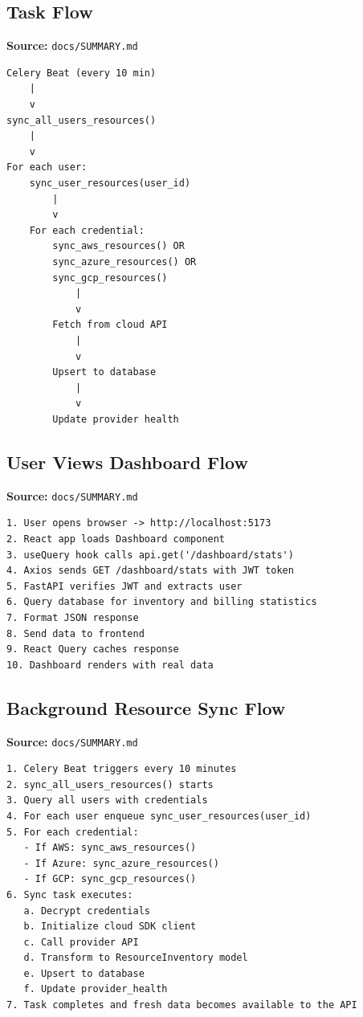 \subsection{Task Flow}
\textbf{Source:} \texttt{docs/SUMMARY.md}
\begin{lstlisting}[numbers=none,basicstyle=\ttfamily\tiny,caption={Task Flow Adapted from docs/SUMMARY.md}]
Celery Beat (every 10 min)
    |
    v
sync_all_users_resources()
    |
    v
For each user:
    sync_user_resources(user_id)
        |
        v
    For each credential:
        sync_aws_resources() OR
        sync_azure_resources() OR
        sync_gcp_resources()
            |
            v
        Fetch from cloud API
            |
            v
        Upsert to database
            |
            v
        Update provider health
\end{lstlisting}

\subsection{User Views Dashboard Flow}
\textbf{Source:} \texttt{docs/SUMMARY.md}
\begin{lstlisting}[numbers=none,basicstyle=\ttfamily\tiny,caption={User Dashboard Flow Adapted from docs/SUMMARY.md}]
1. User opens browser -> http://localhost:5173
2. React app loads Dashboard component
3. useQuery hook calls api.get('/dashboard/stats')
4. Axios sends GET /dashboard/stats with JWT token
5. FastAPI verifies JWT and extracts user
6. Query database for inventory and billing statistics
7. Format JSON response
8. Send data to frontend
9. React Query caches response
10. Dashboard renders with real data
\end{lstlisting}

\subsection{Background Resource Sync Flow}
\textbf{Source:} \texttt{docs/SUMMARY.md}
\begin{lstlisting}[numbers=none,basicstyle=\ttfamily\tiny,caption={Background Resource Sync Flow Adapted from docs/SUMMARY.md}]
1. Celery Beat triggers every 10 minutes
2. sync_all_users_resources() starts
3. Query all users with credentials
4. For each user enqueue sync_user_resources(user_id)
5. For each credential:
   - If AWS: sync_aws_resources()
   - If Azure: sync_azure_resources()
   - If GCP: sync_gcp_resources()
6. Sync task executes:
   a. Decrypt credentials
   b. Initialize cloud SDK client
   c. Call provider API
   d. Transform to ResourceInventory model
   e. Upsert to database
   f. Update provider_health
7. Task completes and fresh data becomes available to the API
\end{lstlisting}

